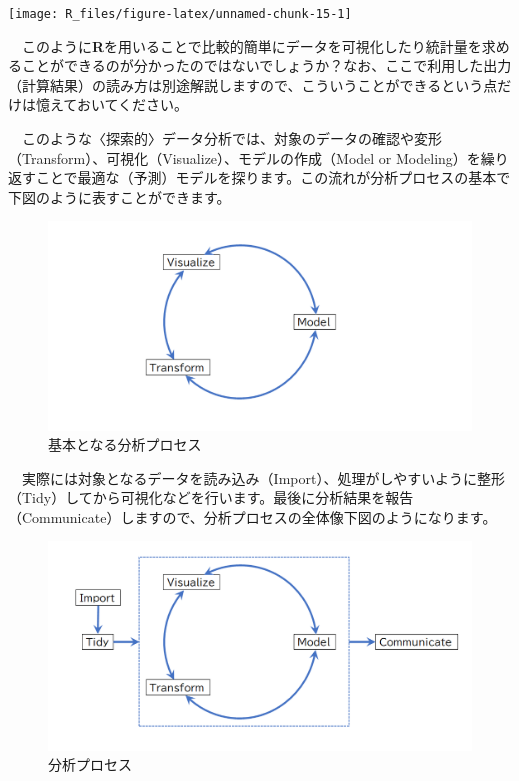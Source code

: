 \documentclass[
  12pt,
]{book}
\begin{document}
\begin{center}\texttt{[image: R\_files/figure-latex/unnamed-chunk-15-1]} \end{center}

　このように\textbf{R}を用いることで比較的簡単にデータを可視化したり統計量を求めることができるのが分かったのではないでしょうか？なお、ここで利用した出力（計算結果）の読み方は別途解説しますので、こういうことができるという点だけは憶えておいてください。

　このような〈探索的〉データ分析では、対象のデータの確認や変形（Transform）、可視化（Visualize）、モデルの作成（Model or Modeling）を繰り返すことで最適な（予測）モデルを探ります。この流れが分析プロセスの基本で下図のように表すことができます。

\begin{figure}[H]

{\centering \includegraphics[width=0.9\linewidth,]{./fig/DSWF/data_science_workflow_step1} 

}

\caption{基本となる分析プロセス}\label{fig:unnamed-chunk-16}
\end{figure}

\newpage

　実際には対象となるデータを読み込み（Import）、処理がしやすいように整形（Tidy）してから可視化などを行います。最後に分析結果を報告（Communicate）しますので、分析プロセスの全体像下図のようになります。

\begin{figure}[H]

{\centering \includegraphics[width=0.9\linewidth,]{./fig/DSWF/data_science_workflow_step2} 

}

\caption{分析プロセス}\label{fig:unnamed-chunk-17}
\end{figure}
\end{document}
